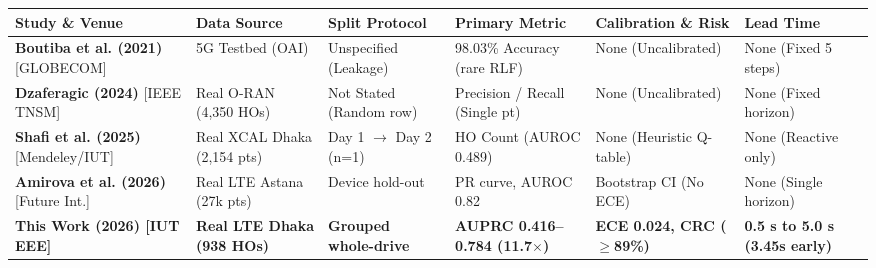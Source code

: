 \documentclass[10pt,a4paper]{article}
\begin{document}
\vspace{3pt}
\label{tab:benchmark}
\fontsize{8.0pt}{10.2pt}\selectfont
\renewcommand{\arraystretch}{1.24}
\begin{tabularx}{\textwidth}{@{}p{3.5cm} X p{2.1cm} X X p{2.0cm}@{}}
\toprule
\rowcolor{TableHead}
\color{white}\textbf{Study \& Venue} & \color{white}\textbf{Data Source} & \color{white}\textbf{Split Protocol} & \color{white}\textbf{Primary Metric} & \color{white}\textbf{Calibration \& Risk} & \color{white}\textbf{Lead Time} \\
\midrule
\textbf{Boutiba et al. (2021)} [GLOBECOM] & 5G Testbed (OAI) & Unspecified (Leakage) & 98.03\% Accuracy (rare RLF) & None (Uncalibrated) & None (Fixed 5 steps) \\
\rowcolor{AltRow}
\textbf{Dzaferagic (2024)} [IEEE TNSM] & Real O-RAN (4,350 HOs) & Not Stated (Random row) & Precision / Recall (Single pt) & None (Uncalibrated) & None (Fixed horizon) \\
\textbf{Shafi et al. (2025)} [Mendeley/IUT] & Real XCAL Dhaka (2,154 pts) & Day 1 $\to$ Day 2 (n=1) & HO Count (AUROC 0.489) & None (Heuristic Q-table) & None (Reactive only) \\
\rowcolor{AltRow}
\textbf{Amirova et al. (2026)} [Future Int.] & Real LTE Astana (27k pts) & Device hold-out & PR curve, AUROC 0.82 & Bootstrap CI (No ECE) & None (Single horizon) \\
\midrule
\rowcolor{HighlightRow}
\textbf{This Work (2026) [IUT EEE]} & \textbf{Real LTE Dhaka (938 HOs)} & \textbf{Grouped whole-drive} & \textbf{AUPRC 0.416--0.784 (11.7$\times$)} & \textbf{ECE 0.024, CRC ($\ge$89\%)} & \textbf{0.5 s to 5.0 s (3.45s early)} \\
\bottomrule
\end{tabularx}
\end{document}
